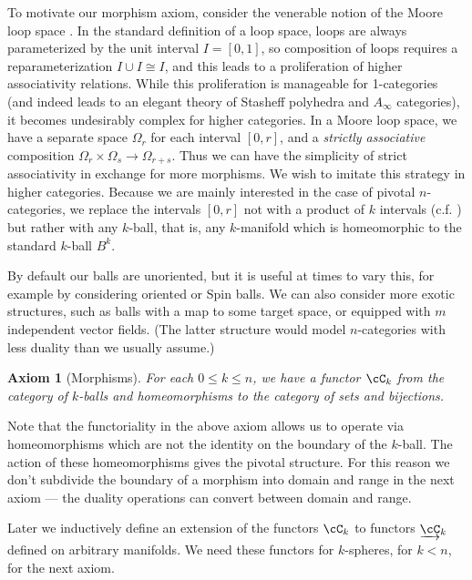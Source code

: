 \documentclass{pnastwo}
\newcommand{\cl}[1]{\underrightarrow{#1}}
\newtheorem{axiom}[prop]{Axiom}
\begin{document}
\begin{article}
To motivate our morphism axiom, consider the venerable notion of the Moore loop space
\cite[\S 2.2]{MR505692}.
In the standard definition of a loop space, loops are always parameterized by the unit interval $I = [0,1]$,
so composition of loops requires a reparameterization $I\cup I \cong I$, and this leads to a proliferation
of higher associativity relations.
While this proliferation is manageable for 1-categories (and indeed leads to an elegant theory
of Stasheff polyhedra and $A_\infty$ categories), it becomes undesirably complex for higher categories.
In a Moore loop space, we have a separate space $\Omega_r$ for each interval $[0,r]$, and a 
{\it strictly associative} composition $\Omega_r\times \Omega_s\to \Omega_{r+s}$.
Thus we can have the simplicity of strict associativity in exchange for more morphisms.
We wish to imitate this strategy in higher categories.
Because we are mainly interested in the case of pivotal $n$-categories, we replace the intervals $[0,r]$ not with
a product of $k$ intervals (c.f. \cite{ulrike-tillmann-2008,0909.2212}) but rather with any $k$-ball, that is, 
any $k$-manifold which is homeomorphic
to the standard $k$-ball $B^k$.

By default our balls are unoriented,
but it is useful at times to vary this,
for example by considering oriented or Spin balls.
We can also consider more exotic structures, such as balls with a map to some target space,
or equipped with $m$ independent vector fields.
(The latter structure would model $n$-categories with less duality than we usually assume.)

\begin{axiom}[Morphisms]
\label{axiom:morphisms}
For each $0 \le k \le n$, we have a functor $\cC_k$ from 
the category of $k$-balls and 
homeomorphisms to the category of sets and bijections.
\end{axiom}

Note that the functoriality in the above axiom allows us to operate via
homeomorphisms which are not the identity on the boundary of the $k$-ball.
The action of these homeomorphisms gives the pivotal structure.
For this reason we don't subdivide the boundary of a morphism
into domain and range in the next axiom --- the duality operations can convert between domain and range.

Later we inductively define an extension of the functors $\cC_k$ to functors $\cl{\cC}_k$ 
defined on arbitrary manifolds. 
We need  these functors for $k$-spheres, for $k<n$, for the next axiom.


\end{article}
\end{document}
